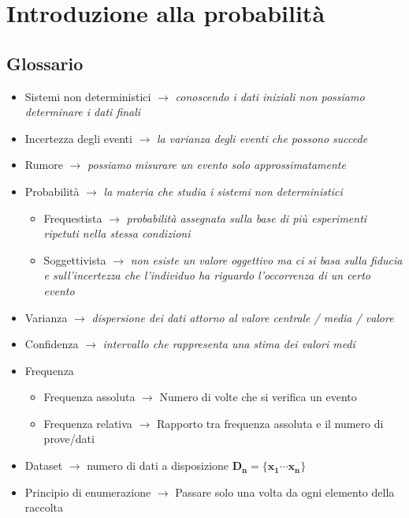 \documentclass[]{article}
\begin{document}
    \tableofcontents
    \newpage
    \section{Introduzione alla probabilità}    
    \subsection{Glossario}
    \begin{itemize}
        \item Sistemi non deterministici $\rightarrow$ \textit{conoscendo i dati iniziali non possiamo determinare i dati finali}
        \item Incertezza degli eventi $\rightarrow$ \textit{la varianza degli eventi che possono succede}
        \item Rumore $\rightarrow$ \textit{possiamo misurare un evento solo approssimatamente}
        \item Probabilità $\rightarrow$ \textit{la materia che studia i sistemi non deterministici}
        \begin{itemize}
            \item Frequestista $\rightarrow $ \textit{probabilità assegnata sulla base di più esperimenti ripetuti nella stessa condizioni}
            \item Soggettivista $\rightarrow $ \textit{non esiste un valore oggettivo ma ci si basa sulla fiducia e sull'incertezza che l'individuo ha riguardo l'occorrenza di un certo evento}
        \end{itemize}
        \item Varianza $\rightarrow$ \textit{dispersione dei dati attorno al valore centrale / media / valore}
        \item Confidenza $\rightarrow$ \textit{intervallo che rappresenta una stima dei valori medi}
        \item Frequenza
        \begin{itemize}
            \item Frequenza assoluta $\rightarrow$ Numero di volte che si verifica un evento
            \item Frequenza relativa $\rightarrow$ Rapporto tra frequenza assoluta e il numero di prove/dati
        \end{itemize}
        \item Dataset $\rightarrow$ numero di dati a disposizione $\boldsymbol{D_n = \{ x_1 \cdots x_n \}} $
        \item Principio di enumerazione $\rightarrow$ Passare solo una volta da ogni elemento della raccolta

\end{itemize}
\end{document}
